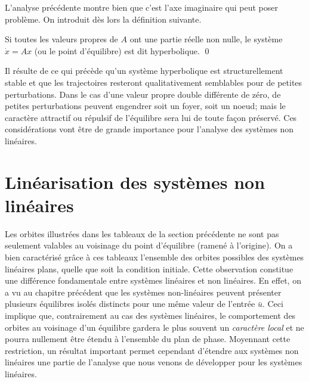 L'analyse pr{é}c{é}dente montre bien que c'est l'axe imaginaire qui peut
poser probl{è}me. On introduit d{è}s lors la d{é}finition suivante. 

\begin{definition} \label{hyperbolique} 
Si toutes
les valeurs propres de $A$ ont une partie r{é}elle non nulle,  le syst{è}me
$\dot x=A x$ (ou le point d'{é}quilibre)
 est dit hyperbolique. \qed 
\end{definition}

Il r{é}sulte de ce qui pr{é}c{è}de qu'un syst{è}me hyperbolique est
structurellement stable et que les trajectoires resteront qualitativement
semblables pour de petites perturbations. Dans le cas
d'une valeur propre double diff{é}rente de z{é}ro, de petites perturbations peuvent engendrer soit un foyer, soit un noeud; 
mais le caract{è}re attractif ou r{é}pulsif de l'{é}quilibre sera lui de toute fa\c{c}on 
pr{é}serv{é}.
Ces consid{é}rations vont {ê}tre
de grande importance pour l'analyse des syst{è}mes non lin{é}aires.
 

 \section{Linéarisation des systèmes non linéaires}

Les orbites illustr{é}es dans les tableaux de la section pr{é}c{é}dente ne sont pas
seulement valables au voisinage du point d'{é}quilibre (ramen{é} {à}
l'origine). On a bien caract{é}ris{é} gr{\^a}ce {à} ces tableaux l'ensemble des
orbites possibles des syst{è}mes lin{é}aires plans, quelle que soit la
condition initiale. Cette observation constitue une diff{é}rence fondamentale
entre syst{è}mes lin{é}aires et non lin{é}aires. En effet, on a vu
 au chapitre pr{é}c{é}dent que les syst{è}mes non-lin{é}aires peuvent
pr{é}senter plusieurs {é}quilibres isol{é}s distincts pour une m{ê}me
valeur de l'entr{é}e $\bar u$. Ceci implique que, contrairement au cas
des syst{è}mes lin{é}aires, le comportement des orbites au voisinage
d'un {é}quilibre gardera le plus souvent un \textit{caract{è}re local} et ne pourra
nullement
{ê}tre {é}tendu {à} l'ensemble du plan de phase. Moyennant cette
restriction, un r{é}sultat important permet cependant d'{é}tendre  aux
syst{è}mes non lin{é}aires une partie de l'analyse que nous venons de
d{é}velopper pour les syst{è}mes lin{é}aires.


